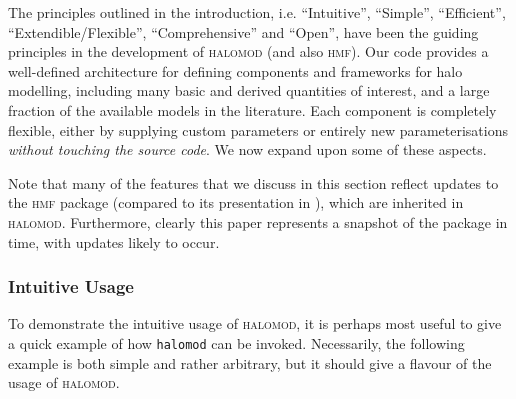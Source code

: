 \documentclass[5p,aas_macros]{elsarticle}
\newcommand{\halomod}{\textsc{halomod}}
\begin{document}
The principles outlined in the introduction, i.e.  ``Intuitive'', ``Simple'', ``Efficient'', ``Extendible/Flexible'', ``Comprehensive'' and ``Open'', have been the guiding principles in the development of \textsc{halomod} (and also \textsc{hmf}). Our code provides a well-defined architecture for defining components and frameworks for halo modelling, including many basic and derived quantities of interest, and a large fraction of the available models in the literature. Each component is completely flexible, either by supplying custom parameters or entirely new parameterisations \textit{without touching the source code}. We now expand upon some of these aspects.

Note that many of the features that we discuss in this section reflect updates to the \textsc{hmf} package (compared to its presentation in \citet{Murray2013}), which are inherited in \textsc{halomod}. Furthermore, clearly this paper represents a snapshot of the package in time, with updates likely to occur. 

\subsubsection{Intuitive Usage}
\label{sec:halomod:overview:usage}
To demonstrate the intuitive usage of \halomod, it is perhaps most useful to give a quick example of how \verb|halomod| can be invoked. 
Necessarily, the following example is both simple and rather arbitrary, but it should give a flavour of the usage of \halomod.
\end{document}

